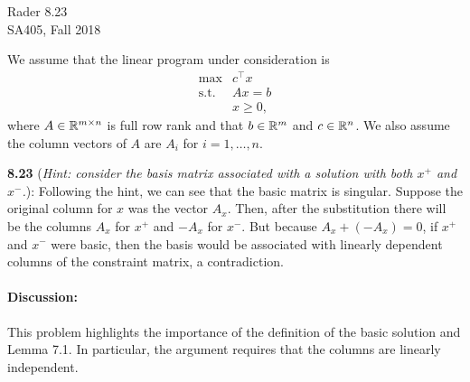 \documentclass[10pt]{article}
\begin{document}
\begin{center}
  {\sc Rader 8.23}\\
  {\sc SA405, Fall 2018} \\
\end{center}

\medskip


\medskip

We assume that the linear program under consideration is
\[
\begin{array}{ll}
  \max & c^\top x \\
  \mbox{s.t.} & A x = b \\
  & x \geq 0,
\end{array}
\]
where $A \in {\mathbb R}^{m \times n}$ is full row rank and that $b \in {\mathbb R}^m$
and $c \in {\mathbb R}^n$. We also assume the column vectors of $A$ are $A_i$
for $i = 1,\ldots,n$.

\bigskip
\noindent
\textbf{8.23} ({\it Hint: consider the basis matrix associated with a
    solution with both $x^+$ and $x^-$.}): Following the hint, we can
  see that the basic matrix is singular. Suppose the original column
  for $x$ was the vector $A_x$. Then, after the substitution there will
  be the columns $A_x$ for $x^+$ and $-A_x$ for $x^-$. But because
  $A_x + (-A_x) = 0$, if $x^+$ and $x^-$
  were basic, then the basis would be associated with linearly
  dependent columns of the constraint matrix, a contradiction.

  \medskip

  \paragraph{Discussion:} This problem highlights the importance of
  the definition of the basic solution and Lemma 7.1. In particular,
  the argument requires that the columns are linearly independent.
\end{document}
